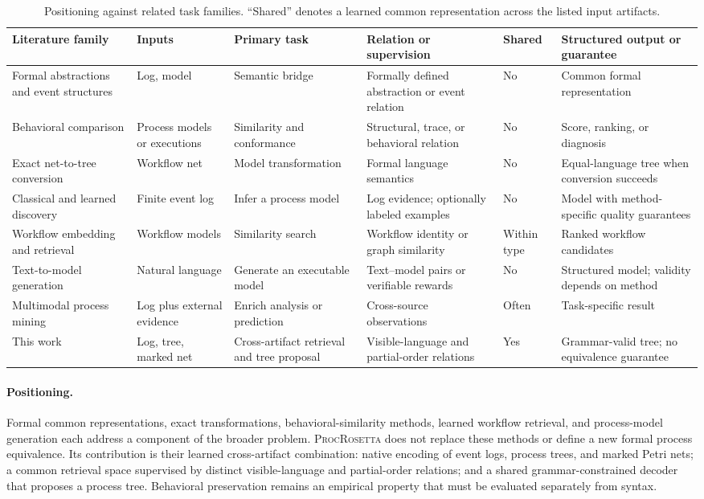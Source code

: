 \documentclass[pdflatex,sn-basic]{sn-jnl}
\newcommand{\model}{\textsc{ProcRosetta}\xspace}
\begin{document}
\begin{table}[!t]
\centering
\caption{Positioning against related task families. ``Shared'' denotes a learned common representation across the listed input artifacts.}
\label{tab:related-positioning}
\scriptsize
\begin{tabularx}{\textwidth}{@{}>{\raggedright\arraybackslash}p{}>{\raggedright\arraybackslash}p{}>{\raggedright\arraybackslash}p{}>{\raggedright\arraybackslash}p{}C{0.09\textwidth}Y@{}}
\toprule
Literature family & Inputs & Primary task & Relation or supervision & Shared & Structured output or guarantee \\
\midrule
Formal abstractions and event structures & Log, model & Semantic bridge & Formally defined abstraction or event relation & No & Common formal representation \\
Behavioral comparison & Process models or executions & Similarity and conformance & Structural, trace, or behavioral relation & No & Score, ranking, or diagnosis \\
Exact net-to-tree conversion & Workflow net & Model transformation & Formal language semantics & No & Equal-language tree when conversion succeeds \\
Classical and learned discovery & Finite event log & Infer a process model & Log evidence; optionally labeled examples & No & Model with method-specific quality guarantees \\
Workflow embedding and retrieval & Workflow models & Similarity search & Workflow identity or graph similarity & Within type & Ranked workflow candidates \\
Text-to-model generation & Natural language & Generate an executable model & Text--model pairs or verifiable rewards & No & Structured model; validity depends on method \\
Multimodal process mining & Log plus external evidence & Enrich analysis or prediction & Cross-source observations & Often & Task-specific result \\
This work & Log, tree, marked net & Cross-artifact retrieval and tree proposal & Visible-language and partial-order relations & Yes & Grammar-valid tree; no equivalence guarantee \\
\bottomrule
\end{tabularx}
\end{table}

\paragraph{Positioning.}
Formal common representations, exact transformations, behavioral-similarity methods, learned workflow retrieval, and process-model generation each address a component of the broader problem. \model does not replace these methods or define a new formal process equivalence. Its contribution is their learned cross-artifact combination: native encoding of event logs, process trees, and marked Petri nets; a common retrieval space supervised by distinct visible-language and partial-order relations; and a shared grammar-constrained decoder that proposes a process tree. Behavioral preservation remains an empirical property that must be evaluated separately from syntax.
\end{document}
